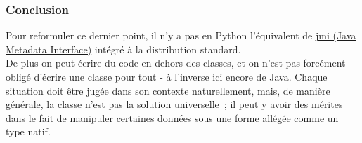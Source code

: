     \hypertarget{conclusion}{%
\subsubsection{Conclusion}\label{conclusion}}

    Pour reformuler ce dernier point, il n'y a pas en Python l'équivalent de
\href{https://en.wikipedia.org/wiki/Java_Metadata_Interface}{jmi (Java
Metadata Interface)} intégré à la distribution standard.\\

De plus on peut écrire du code en dehors des classes, et on n'est pas
forcément obligé d'écrire une classe pour tout - à l'inverse ici encore
de Java. Chaque situation doit être jugée dans son contexte
naturellement, mais, de manière générale, la classe n'est pas la
solution universelle~; il peut y avoir des mérites dans le fait de
manipuler certaines données sous une forme allégée comme un type natif.